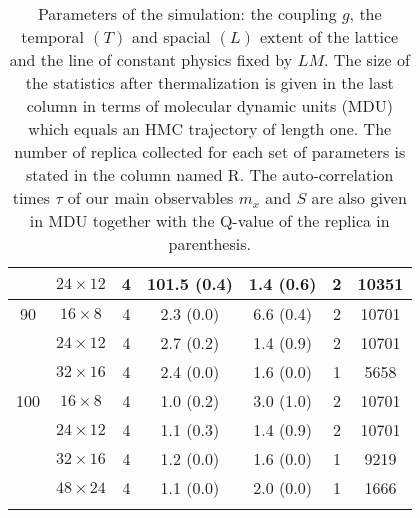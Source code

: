 \begin{longtable}{ccccccc}
    & $24 \times  12$ &  4 & 101.5 \; (0.4) & 1.4 \; (0.6) & 2 & 10351 \\
\midrule
 90 & $16 \times   8$ &  4 & 2.3 \; (0.0) & 6.6 \; (0.4) & 2 & 10701 \\
    & $24 \times  12$ &  4 & 2.7 \; (0.2) & 1.4 \; (0.9) & 2 & 10701 \\
    & $32 \times  16$ &  4 & 2.4 \; (0.0) & 1.6 \; (0.0) & 1 & 5658 \\
\midrule
100 & $16 \times   8$ &  4 & 1.0 \; (0.2) & 3.0 \; (1.0) & 2 & 10701 \\
    & $24 \times  12$ &  4 & 1.1 \; (0.3) & 1.4 \; (0.9) & 2 & 10701 \\
    & $32 \times  16$ &  4 & 1.2 \; (0.0) & 1.6 \; (0.0) & 1 & 9219 \\
    & $48 \times  24$ &  4 & 1.1 \; (0.0) & 2.0 \; (0.0) & 1 & 1666 \\
\bottomrule
\caption{Parameters of the simulation: the coupling $g$, the temporal $(T)$ and spacial $(L)$ extent of the lattice and the line of constant physics fixed by $LM$. The size of the statistics after thermalization is given in the last column in terms of molecular dynamic units (MDU) which equals an HMC trajectory of length one. The number of replica collected for each set of parameters is stated in the column named R. The auto-correlation times $\tau$ of our main observables $m_{x}$ and $S$ are also given in MDU together with the Q-value of the replica in parenthesis. \label{tab: runs_param}}
\end{longtable}
